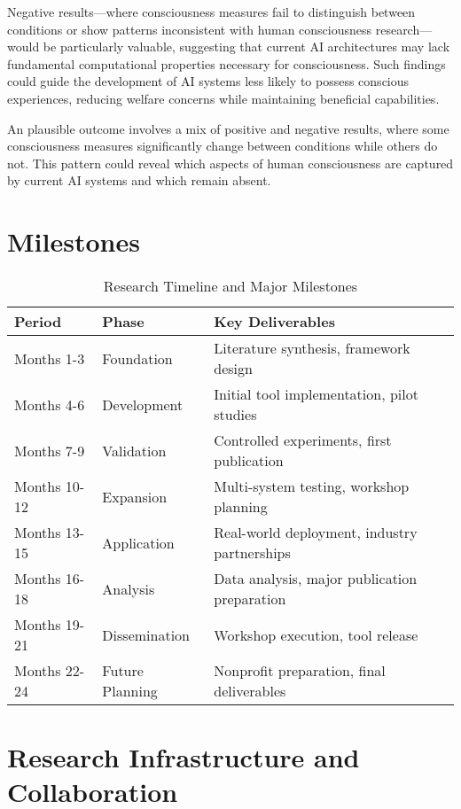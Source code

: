 \documentclass[11pt,a4paper]{article}
\begin{document}
Negative results—where consciousness measures fail to distinguish between conditions or show patterns inconsistent with human consciousness research—would be particularly valuable, suggesting that current AI architectures may lack fundamental computational properties necessary for consciousness. Such findings could guide the development of AI systems less likely to possess conscious experiences, reducing welfare concerns while maintaining beneficial capabilities.

An plausible outcome involves a mix of positive and negative results, where some consciousness measures significantly change between conditions while others do not. This pattern could reveal which aspects of human consciousness are captured by current AI systems and which remain absent.
\section{Milestones}
\begin{table}[h]
    \centering
    \begin{tabular}{|l|l|p{8cm}|}
    \hline
    \textbf{Period} & \textbf{Phase} & \textbf{Key Deliverables} \\
    \hline
    Months 1-3 & Foundation & Literature synthesis, framework design \\
    \hline
    Months 4-6 & Development & Initial tool implementation, pilot studies \\
    \hline
    Months 7-9 & Validation & Controlled experiments, first publication \\
    \hline
    Months 10-12 & Expansion & Multi-system testing, workshop planning \\
    \hline
    Months 13-15 & Application & Real-world deployment, industry partnerships \\
    \hline
    Months 16-18 & Analysis & Data analysis, major publication preparation \\
    \hline
    Months 19-21 & Dissemination & Workshop execution, tool release \\
    \hline
    Months 22-24 & Future Planning & Nonprofit preparation, final deliverables \\
    \hline
    \end{tabular}
    \caption{Research Timeline and Major Milestones}
    \label{tab:timeline}
    \end{table}
    \section{Research Infrastructure and Collaboration}
\end{document}
